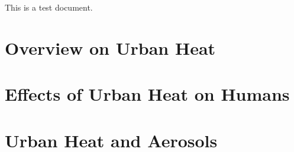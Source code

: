 This is a test document.
\blindtext

\section{Overview on Urban Heat}
	\blindtext
	
\section{Effects of Urban Heat on Humans}
	\blindtext

\section{Urban Heat and Aerosols}
	\blindtext